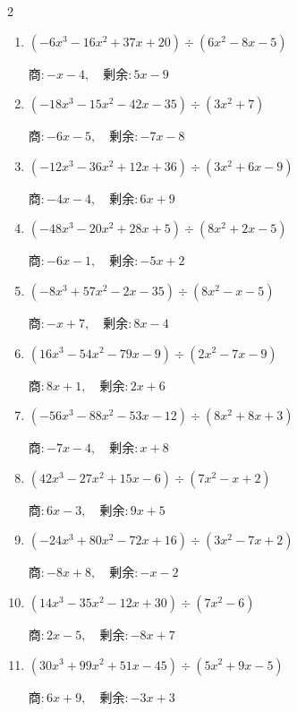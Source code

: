 \begin{multicols}{2}
\begin{enumerate}
        $商 : -4x+2, \quad 剰余 : -4x+8$

  \item $(-6x^{3}-16x^{2}+37x+20) \div (6x^{2}-8x-5)$

        $商 : -x-4, \quad 剰余 : 5x-9$

  \item $(-18x^{3}-15x^{2}-42x-35) \div (3x^{2}+7)$

        $商 : -6x-5, \quad 剰余 : -7x-8$

  \item $(-12x^{3}-36x^{2}+12x+36) \div (3x^{2}+6x-9)$

        $商 : -4x-4, \quad 剰余 : 6x+9$

\columnbreak %

  \item $(-48x^{3}-20x^{2}+28x+5) \div (8x^{2}+2x-5)$

        $商 : -6x-1, \quad 剰余 : -5x+2$

  \item $(-8x^{3}+57x^{2}-2x-35) \div (8x^{2}-x-5)$

        $商 : -x+7, \quad 剰余 : 8x-4$

  \item $(16x^{3}-54x^{2}-79x-9) \div (2x^{2}-7x-9)$

        $商 : 8x+1, \quad 剰余 : 2x+6$

  \item $(-56x^{3}-88x^{2}-53x-12) \div (8x^{2}+8x+3)$

        $商 : -7x-4, \quad 剰余 : x+8$

  \item $(42x^{3}-27x^{2}+15x-6) \div (7x^{2}-x+2)$

        $商 : 6x-3, \quad 剰余 : 9x+5$

\columnbreak %

\resetques

  \item $(-24x^{3}+80x^{2}-72x+16) \div (3x^{2}-7x+2)$

        $商 : -8x+8, \quad 剰余 : -x-2$

  \item $(14x^{3}-35x^{2}-12x+30) \div (7x^{2}-6)$

        $商 : 2x-5, \quad 剰余 : -8x+7$

  \item $(30x^{3}+99x^{2}+51x-45) \div (5x^{2}+9x-5)$

        $商 : 6x+9, \quad 剰余 : -3x+3$


\end{enumerate}
\end{multicols}
